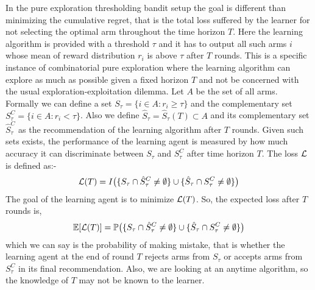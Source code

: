 	In the pure exploration thresholding bandit setup the goal is different than minimizing the cumulative regret, that is the total loss suffered by the learner for not selecting the optimal arm throughout the time horizon $T$. Here the learning algorithm is provided with a threshold $\tau$ and it has to output all such arms $i$ whose mean of reward distribution $r_{i}$ is above $\tau$ after $T$ rounds. This is a specific instance of combinatorial pure exploration where the learning algorithm can explore as much as possible given a fixed horizon $T$ and not be concerned with the usual exploration-exploitation dilemma. Let $A$ be the set of all arms. Formally we can define a set $S_{\tau}=\lbrace i\in A: r_{i}\geq \tau \rbrace$ and the complementary set $S_{\tau}^{C}=\lbrace i\in A: r_{i} < \tau \rbrace$. Also we define $\hat{S}_{\tau}=\hat{S}_{\tau}(T)\subset A$ and its complementary set $\hat{S}_{\tau}^{C}$ as the recommendation of the learning algorithm after $T$ rounds. Given such sets exists, the performance of the learning agent is measured by how much accuracy it can discriminate between $S_{\tau}$ and $S_{\tau}^{C}$ after time horizon $T$. The loss $\mathcal{L}$ is defined as:-
\begin{align*}
\mathcal{L} (T) = I\big(\lbrace S_{\tau}\cap \hat{S}_{\tau}^{C}\neq \emptyset\rbrace    \cup    \lbrace\hat{S}_{\tau}\cap S_{\tau}^{C}\neq \emptyset\rbrace\big)
\end{align*}			
The goal of the learning agent is to minimize $\mathcal{L} (T)$. So, the expected loss after $T$ rounds is,
\begin{align*}
\mathbb{E}[\mathcal{L}(T)] = \mathbb{P}\big(\lbrace S_{\tau}\cap \hat{S}_{\tau}^{C} \neq \emptyset \rbrace  \cup   \lbrace \hat{S}_{\tau}\cap S_{\tau}^{C} \neq \emptyset\rbrace\big)
\end{align*}
which we can say is the probability of making mistake, that is whether the learning agent at the end of round $T$ rejects arms from $S_{\tau}$ or accepts arms from $S_{\tau}^{C}$ in its final recommendation. Also, we are looking at an anytime algorithm, so the knowledge of $T$ may not be known to the learner.

